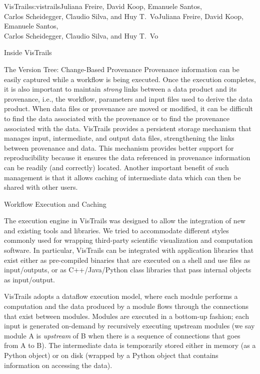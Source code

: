 \begin{aosachaptertoc}{VisTrails}{s:vistrails}{Juliana Freire, David Koop, Emanuele Santos, \\ Carlos Scheidegger, Claudio Silva, and Huy T.\ Vo}{Juliana Freire, David Koop, Emanuele Santos, \\ \hspace*{0.9cm} Carlos Scheidegger, Claudio Silva, and Huy T.\ Vo}
\begin{aosasect1}{Inside VisTrails}
\begin{aosasect2}{The Version Tree: Change-Based Provenance}
Provenance information can be easily captured while a workflow
is being executed. Once the execution completes, it is also important
to maintain \emph{strong} links between a data product and its
provenance, i.e., the workflow, parameters and input files used to
derive the data product. When data files or provenance are moved or
modified, it can be difficult to find the data associated with the
provenance or to find the provenance associated with the data.
VisTrails provides a persistent storage mechanism that manages input,
intermediate, and output data files, strengthening the links between
provenance and data.  This mechanism provides better support for
reproducibility because it ensures the data referenced in provenance
information can be readily (and correctly) located.  Another important
benefit of such management is that it allows caching of intermediate
data which can then be shared with other users.

\end{aosasect2}

\begin{aosasect2}{Workflow Execution and Caching}
\label{sec.vistrails.exec-cache}

The execution engine in VisTrails was designed to allow the
integration of new and existing tools and libraries.  We tried to
accommodate different styles commonly used for wrapping third-party
scientific visualization and computation software. In particular,
VisTrails can be integrated with application libraries that exist
either as pre-compiled binaries that are executed on a shell and use
files as input/outputs, or as C++/Java/Python class libraries that
pass internal objects as input/output.

VisTrails adopts a dataflow execution model, where each module
performs a computation and the data produced by a module flows through
the connections that exist between modules. Modules are executed in a
bottom-up fashion; each input is generated on-demand by recursively
executing upstream modules (we say module A is \emph{upstream} of B
when there is a sequence of connections that goes from A to B).  The
intermediate data is temporarily stored either in memory (as a Python
object) or on disk (wrapped by a Python object that contains
information on accessing the data).


\end{aosasect2}
\end{aosasect1}
\end{aosachaptertoc}
